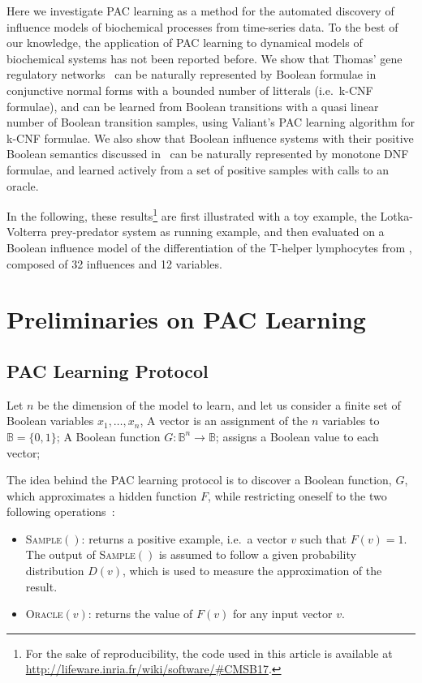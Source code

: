 \documentclass{llncs}
\begin{document}
Here we investigate PAC learning as a method for the automated discovery of influence models of biochemical processes from time-series data. 
To the best of our knowledge, 
the application of PAC learning to dynamical models of biochemical systems has not been reported before.
We show that Thomas' gene regulatory networks~\cite{Thomas91jtb,Thomas73jtb} can be naturally represented by 
Boolean formulae in conjunctive normal forms with a bounded number of litterals (i.e.~k-CNF formulae),
and can be learned from Boolean transitions with a quasi linear number of Boolean transition samples, using Valiant's PAC learning algorithm for k-CNF formulae.
We also show that Boolean influence systems with their positive Boolean semantics discussed in~\cite{FMRS16cmsb}
can be naturally represented by monotone DNF formulae,
and learned actively from a set of positive samples with calls to an oracle.

In the following, these results\footnote{For the sake of reproducibility, the code used in this article is available at \url{http://lifeware.inria.fr/wiki/software/\#CMSB17}.} are first illustrated with a toy example, the Lotka-Volterra prey-predator system as running example,
and then evaluated on a Boolean influence model of 
the differentiation of the T-helper lymphocytes from \cite{RRMTC06tcsb,Mendoza06biosystems},
composed of 32 influences and 12 variables.


\section{Preliminaries on PAC Learning}\label{pac}

\subsection{PAC Learning Protocol}

Let $n$ be the dimension of the model to learn, and let us consider a finite set of Boolean variables $x_1,\ldots,x_n$,
 A vector is an assignment of the $n$ variables to  $\mathbb{B} = \{0,1\}$;
 A Boolean function $G:{\mathbb{B}}^n \rightarrow \mathbb{B}$;
	assigns a Boolean value to each vector;


The idea behind the PAC learning protocol is to discover a Boolean function, $G$, which approximates a hidden function $F$, while restricting oneself to the two following operations~:
\begin{itemize}
  \item
\textsc{Sample}$()$: returns a positive example, i.e.~a vector $v$ such that $F(v)=1$.
The output of \textsc{Sample}$()$ is assumed to follow a given probability distribution $D(v)$, which is used to measure the approximation of the result.
  \item
\textsc{Oracle}$(v)$: returns the value of $F(v)$ for any input vector $v$.
\end{itemize}
\end{document}
